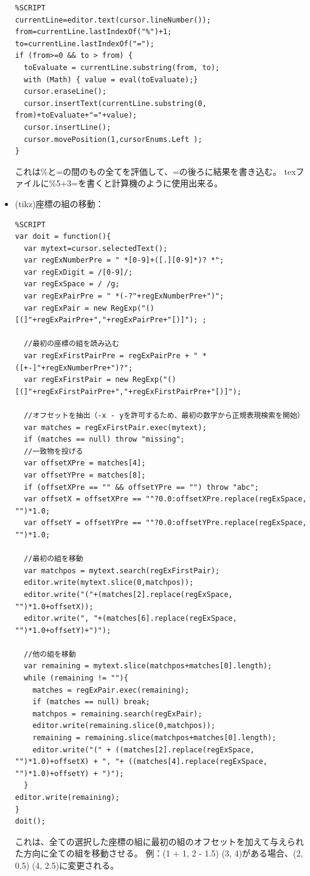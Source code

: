 \documentclass[]{book}
\begin{document}
\begin{itemize}
\begin{lstlisting}
%SCRIPT
currentLine=editor.text(cursor.lineNumber());
from=currentLine.lastIndexOf("%")+1;
to=currentLine.lastIndexOf("=");
if (from>=0 && to > from) {
  toEvaluate = currentLine.substring(from, to);
  with (Math) { value = eval(toEvaluate);}
  cursor.eraseLine();
  cursor.insertText(currentLine.substring(0, from)+toEvaluate+"="+value);
  cursor.insertLine();
  cursor.movePosition(1,cursorEnums.Left );
}
\end{lstlisting}

  これは\%と=の間のもの全てを評価して、=の後ろに結果を書き込む。
  texファイルに\%5+3=を書くと計算機のように使用出来る。
\item
  (tikz)座標の組の移動：

\begin{lstlisting}
%SCRIPT
var doit = function(){
  var mytext=cursor.selectedText();
  var regExNumberPre = " *[0-9]+([.][0-9]*)? *";
  var regExDigit = /[0-9]/;
  var regExSpace = / /g;
  var regExPairPre = " *(-?"+regExNumberPre+")";
  var regExPair = new RegExp("()[(]"+regExPairPre+","+regExPairPre+"[)]"); ;

  //最初の座標の組を読み込む
  var regExFirstPairPre = regExPairPre + " *([+-]"+regExNumberPre+")?";
  var regExFirstPair = new RegExp("()[(]"+regExFirstPairPre+","+regExFirstPairPre+"[)]");

  //オフセットを抽出（-x - yを許可するため、最初の数字から正規表現検索を開始）
  var matches = regExFirstPair.exec(mytext);
  if (matches == null) throw "missing";
  //一致物を投げる
  var offsetXPre = matches[4];
  var offsetYPre = matches[8];
  if (offsetXPre == "" && offsetYPre == "") throw "abc";
  var offsetX = offsetXPre == ""?0.0:offsetXPre.replace(regExSpace, "")*1.0;
  var offsetY = offsetYPre == ""?0.0:offsetYPre.replace(regExSpace, "")*1.0;

  //最初の組を移動
  var matchpos = mytext.search(regExFirstPair);
  editor.write(mytext.slice(0,matchpos));
  editor.write("("+(matches[2].replace(regExSpace, "")*1.0+offsetX));
  editor.write(", "+(matches[6].replace(regExSpace, "")*1.0+offsetY)+")");

  //他の組を移動
  var remaining = mytext.slice(matchpos+matches[0].length);
  while (remaining != ""){
    matches = regExPair.exec(remaining);
    if (matches == null) break;
    matchpos = remaining.search(regExPair);
    editor.write(remaining.slice(0,matchpos));
    remaining = remaining.slice(matchpos+matches[0].length);
    editor.write("(" + ((matches[2].replace(regExSpace, "")*1.0)+offsetX) + ", "+ ((matches[4].replace(regExSpace, "")*1.0)+offsetY) + ")");
  }
editor.write(remaining);
}
doit();
\end{lstlisting}

  これは、全ての選択した座標の組に最初の組のオフセットを加えて与えられた方向に全ての組を移動させる。
  例：(1 + 1, 2 - 1.5) (3, 4)がある場合、(2, 0.5) (4, 2.5)に変更される。
\end{itemize}
\end{document}
